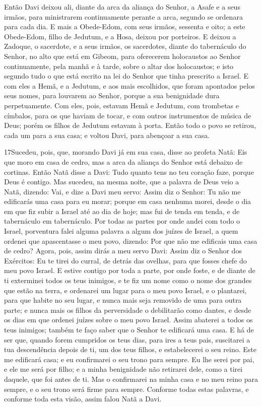 Então Davi deixou ali, diante da arca da aliança do Senhor, a
Asafe e a seus irmãos, para ministrarem continuamente perante a
arca, segundo se ordenara para cada dia. E mais a Obede-Edom,
com seus irmãos, sessenta e oito; a este Obede-Edom, filho de
Jedutum, e a Hosa, deixou por porteiros. E deixou a Zadoque,
o sacerdote, e a seus irmãos, os sacerdotes, diante do tabernáculo
do Senhor, no alto que está em Gibeom, para oferecerem
holocaustos ao Senhor continuamente, pela manhã e à tarde, sobre o
altar dos holocaustos; e isto segundo tudo o que está escrito na lei
do Senhor que tinha prescrito a Israel. E com eles a Hemã, e
a Jedutum, e aos mais escolhidos, que foram apontados pelos seus
nomes, para louvarem ao Senhor, porque a sua benignidade dura
perpetuamente. Com eles, pois, estavam Hemã e Jedutum, com
trombetas e címbalos, para os que haviam de tocar, e com outros
instrumentos de música de Deus; porém os filhos de Jedutum estavam à
porta. Então todo o povo se retirou, cada um para a sua casa;
e voltou Davi, para abençoar a sua casa.

\medskip

\lettrine{17} Sucedeu, pois, que, morando Davi já em sua casa,
disse ao profeta Natã: Eis que moro em casa de cedro, mas a arca da
aliança do Senhor está debaixo de cortinas. Então Natã disse a
Davi: Tudo quanto tens no teu coração faze, porque Deus é contigo.
Mas sucedeu, na mesma noite, que a palavra de Deus veio a Natã,
dizendo: Vai, e dize a Davi meu servo: Assim diz o Senhor: Tu
não me edificarás uma casa para eu morar; porque em casa nenhuma
morei, desde o dia em que fiz subir a Israel até ao dia de hoje; mas
fui de tenda em tenda, e de tabernáculo em tabernáculo. Por
todas as partes por onde andei com todo o Israel, porventura falei
alguma palavra a algum dos juízes de Israel, a quem ordenei que
apascentasse o meu povo, dizendo: Por que não me edificais uma casa
de cedro? Agora, pois, assim dirás a meu servo Davi: Assim diz o
Senhor dos Exércitos: Eu te tirei do curral, de detrás das ovelhas,
para que fosses chefe do meu povo Israel. E estive contigo por
toda a parte, por onde foste, e de diante de ti exterminei todos os
teus inimigos, e te fiz um nome como o nome dos grandes que estão na
terra, e ordenarei um lugar para o meu povo Israel, e o
plantarei, para que habite no seu lugar, e nunca mais seja removido
de uma para outra parte; e nunca mais os filhos da perversidade o
debilitarão como dantes, e desde os dias em que ordenei
juízes sobre o meu povo Israel. Assim abaterei a todos os teus
inimigos; também te faço saber que o Senhor te edificará uma casa.
E há de ser que, quando forem cumpridos os teus dias, para
ires a teus pais, suscitarei a tua descendência depois de ti, um dos
teus filhos, e estabelecerei o seu reino. Este me edificará
casa; e eu confirmarei o seu trono para sempre. Eu lhe serei
por pai, e ele me será por filho; e a minha benignidade não
retirarei dele, como a tirei daquele, que foi antes de ti.
Mas o confirmarei na minha casa e no meu reino para sempre, e
o seu trono será firme para sempre. Conforme todas estas
palavras, e conforme toda esta visão, assim falou Natã a Davi.

